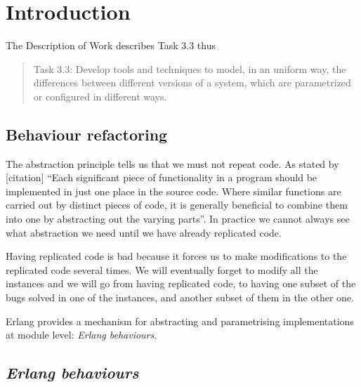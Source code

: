 \section{Introduction}

The Description of Work describes Task 3.3 thus
\begin{quote}
Task 3.3: Develop tools and techniques to model, in an uniform way, the differences between different versions of
a system, which are parametrized or configured in different ways.
\end{quote}

\subsection{Behaviour refactoring}

The abstraction principle tells us that we must not repeat code. As
stated by {[}citation{]} ``Each significant piece of functionality
in a program should be implemented in just one place in the source
code. Where similar functions are carried out by distinct pieces of
code, it is generally beneficial to combine them into one by abstracting
out the varying parts''. In practice we cannot always see what abstraction
we need until we have already replicated code. 

Having replicated code is bad because it forces us to make modifications
to the replicated code several times. We will eventually forget to
modify all the instances and we will go from having replicated code,
to having one subset of the bugs solved in one of the instances, and
another subset of them in the other one.

Erlang provides a mechanism for abstracting and parametrising implementations
at module level: \emph{Erlang behaviours}.

\subsection{\emph{Erlang behaviours}\label{sec:erlang_behaviours}}

